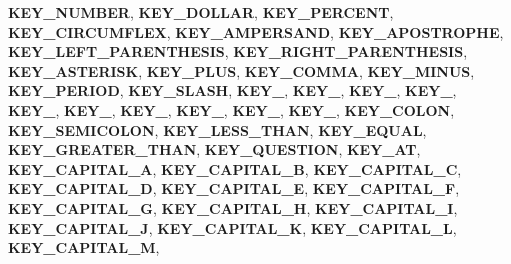 \begin{DoxyCompactItemize}
{\bfseries K\+E\+Y\+\_\+\+N\+U\+M\+B\+ER}, 
{\bfseries K\+E\+Y\+\_\+\+D\+O\+L\+L\+AR}, 
{\bfseries K\+E\+Y\+\_\+\+P\+E\+R\+C\+E\+NT}, 
{\bfseries K\+E\+Y\+\_\+\+C\+I\+R\+C\+U\+M\+F\+L\+EX}, 
\newline
{\bfseries K\+E\+Y\+\_\+\+A\+M\+P\+E\+R\+S\+A\+ND}, 
{\bfseries K\+E\+Y\+\_\+\+A\+P\+O\+S\+T\+R\+O\+P\+HE}, 
{\bfseries K\+E\+Y\+\_\+\+L\+E\+F\+T\+\_\+\+P\+A\+R\+E\+N\+T\+H\+E\+S\+IS}, 
{\bfseries K\+E\+Y\+\_\+\+R\+I\+G\+H\+T\+\_\+\+P\+A\+R\+E\+N\+T\+H\+E\+S\+IS}, 
\newline
{\bfseries K\+E\+Y\+\_\+\+A\+S\+T\+E\+R\+I\+SK}, 
{\bfseries K\+E\+Y\+\_\+\+P\+L\+US}, 
{\bfseries K\+E\+Y\+\_\+\+C\+O\+M\+MA}, 
{\bfseries K\+E\+Y\+\_\+\+M\+I\+N\+US}, 
\newline
{\bfseries K\+E\+Y\+\_\+\+P\+E\+R\+I\+OD}, 
{\bfseries K\+E\+Y\+\_\+\+S\+L\+A\+SH}, 
{\bfseries K\+E\+Y\+\_}, 
{\bfseries K\+E\+Y\+\_}, 
\newline
{\bfseries K\+E\+Y\+\_}, 
{\bfseries K\+E\+Y\+\_}, 
{\bfseries K\+E\+Y\+\_}, 
{\bfseries K\+E\+Y\+\_}, 
\newline
{\bfseries K\+E\+Y\+\_}, 
{\bfseries K\+E\+Y\+\_}, 
{\bfseries K\+E\+Y\+\_}, 
{\bfseries K\+E\+Y\+\_}, 
\newline
{\bfseries K\+E\+Y\+\_\+\+C\+O\+L\+ON}, 
{\bfseries K\+E\+Y\+\_\+\+S\+E\+M\+I\+C\+O\+L\+ON}, 
{\bfseries K\+E\+Y\+\_\+\+L\+E\+S\+S\+\_\+\+T\+H\+AN}, 
{\bfseries K\+E\+Y\+\_\+\+E\+Q\+U\+AL}, 
\newline
{\bfseries K\+E\+Y\+\_\+\+G\+R\+E\+A\+T\+E\+R\+\_\+\+T\+H\+AN}, 
{\bfseries K\+E\+Y\+\_\+\+Q\+U\+E\+S\+T\+I\+ON}, 
{\bfseries K\+E\+Y\+\_\+\+AT}, 
{\bfseries K\+E\+Y\+\_\+\+C\+A\+P\+I\+T\+A\+L\+\_\+A}, 
\newline
{\bfseries K\+E\+Y\+\_\+\+C\+A\+P\+I\+T\+A\+L\+\_\+B}, 
{\bfseries K\+E\+Y\+\_\+\+C\+A\+P\+I\+T\+A\+L\+\_\+C}, 
{\bfseries K\+E\+Y\+\_\+\+C\+A\+P\+I\+T\+A\+L\+\_\+D}, 
{\bfseries K\+E\+Y\+\_\+\+C\+A\+P\+I\+T\+A\+L\+\_\+E}, 
\newline
{\bfseries K\+E\+Y\+\_\+\+C\+A\+P\+I\+T\+A\+L\+\_\+F}, 
{\bfseries K\+E\+Y\+\_\+\+C\+A\+P\+I\+T\+A\+L\+\_\+G}, 
{\bfseries K\+E\+Y\+\_\+\+C\+A\+P\+I\+T\+A\+L\+\_\+H}, 
{\bfseries K\+E\+Y\+\_\+\+C\+A\+P\+I\+T\+A\+L\+\_\+I}, 
\newline
{\bfseries K\+E\+Y\+\_\+\+C\+A\+P\+I\+T\+A\+L\+\_\+J}, 
{\bfseries K\+E\+Y\+\_\+\+C\+A\+P\+I\+T\+A\+L\+\_\+K}, 
{\bfseries K\+E\+Y\+\_\+\+C\+A\+P\+I\+T\+A\+L\+\_\+L}, 
{\bfseries K\+E\+Y\+\_\+\+C\+A\+P\+I\+T\+A\+L\+\_\+M}, 
\newline

\end{DoxyCompactItemize}
